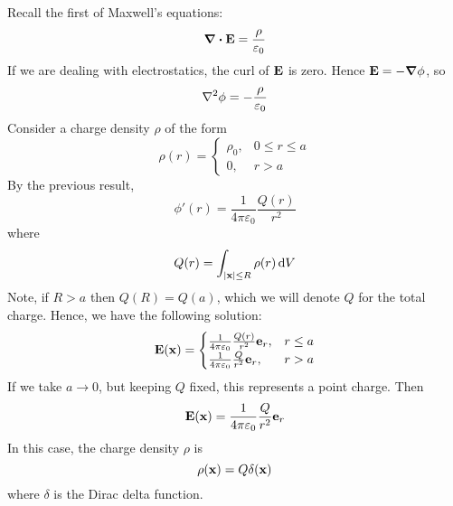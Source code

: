 \begin{example}
	Recall the first of Maxwell's equations:
	\[
		\div{\vb E} = \frac{\rho}{\varepsilon_0}
	\]
	If we are dealing with electrostatics, the curl of \(\vb E\) is zero.
	Hence \(\vb E = -\grad{\phi}\), so
	\[
		\laplacian{\phi} = -\frac{\rho}{\varepsilon_0}
	\]
	Consider a charge density \(\rho\) of the form
	\[
		\rho(r) = \begin{cases}
			\rho_0, & 0 \leq r \leq a \\
			0,      & r > a
		\end{cases}
	\]
	By the previous result,
	\[
		\phi'(r) = \frac{1}{4 \pi \varepsilon_0} \frac{Q(r)}{r^2}
	\]
	where
	\[
		Q(r) = \int_{\abs{\vb x} \leq R} \rho(r) \dd{V}
	\]
	Note, if \(R > a\) then \(Q(R) = Q(a)\), which we will denote \(Q\) for the total charge.
	Hence, we have the following solution:
	\[
		\vb E(\vb x) = \begin{cases}
			\frac{1}{4 \pi \varepsilon_0} \frac{Q(r)}{r^2}\vb e_r, & r \leq a \\
			\frac{1}{4 \pi \varepsilon_0} \frac{Q}{r^2}\vb e_r,    & r > a
		\end{cases}
	\]
	If we take \(a \to 0\), but keeping \(Q\) fixed, this represents a point charge.
	Then
	\[
		\vb E(\vb x) = \frac{1}{4 \pi \varepsilon_0} \frac{Q}{r^2}\vb e_r
	\]
	In this case, the charge density \(\rho\) is
	\[
		\rho(\vb x) = Q\delta(\vb x)
	\]
	where \(\delta\) is the Dirac delta function.
\end{example}


